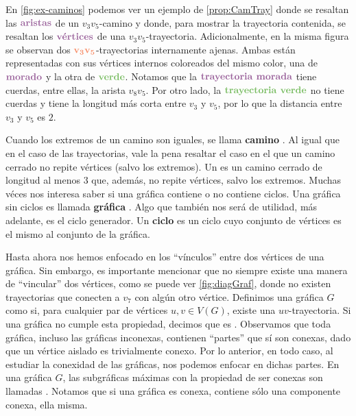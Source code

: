 En \cref{fig:ex-caminos} podemos ver un ejemplo de \cref{prop:CamTray} donde se
resaltan las ${\color{morado}\bf aristas}$ de un $v_3 v_5$-camino y donde, para
mostrar la trayectoria contenida, se resaltan los
${\color{morado}\textbf{v\'ertices}}$ de una $v_3 v_5$-trayectoria.
Adicionalmente, en la misma figura se observan dos ${\color{coral}\bf v_3
v_5}$-trayectorias internamente ajenas. Ambas est\'an representadas con sus
v\'ertices internos coloreados del mismo color, una de ${\color{morado}\bf
morado}$ y la otra de ${\color{verde}\bf verde}$. Notamos que la
${\color{morado}\textbf{trayectoria morada}}$ tiene cuerdas, entre ellas, la
arista $v_8v_5$. Por otro lado, la ${\color{verde}\textbf{trayectoria verde}}$
no tiene cuerdas y tiene la longitud m\'as corta entre $v_3$ y $v_5$, por lo que
la distancia entre $v_3$ y $v_5$ es $2$.

Cuando los extremos de un camino son iguales, se llama \textbf{camino}
. Al igual que en el caso de las trayectorias, vale
la pena resaltar el caso en el que un camino cerrado no repite v\'ertices (salvo
los extremos). Un  es un camino cerrado de longitud al menos $3$
que, adem\'as, no repite v\'ertices, salvo los extremos.  Muchas v\'eces nos
interesa saber si una gr\'afica contiene o no contiene ciclos. Una gr\'afica sin
ciclos es llamada \textbf{gr\'afica} . Algo que
tambi\'en nos ser\'a de utilidad, m\'as adelante, es el ciclo generador. Un
\textbf{ciclo} es un ciclo cuyo conjunto de
v\'ertices es el mismo al conjunto de la gr\'afica.
   
Hasta ahora nos hemos enfocado en los ``v\'inculos'' entre dos v\'ertices de una
gr\'afica. Sin embargo, es importante mencionar que no siempre existe una manera de
``vincular'' dos v\'ertices, como se puede ver \cref{fig:diagGraf}, donde no
existen trayectorias que conecten a $v_7$ con alg\'un otro v\'ertice.  Definimos
una gr\'afica $G$ como  si,
para cualquier par de v\'ertices $u,v \in V(G)$, existe una $uv$-trayectoria. Si
una gr\'afica no cumple esta propiedad, decimos que es
. Observamos que toda gr\'afica, incluso las
gr\'aficas inconexas, contienen ``partes'' que s\'i son conexas, dado que un
v\'ertice aislado es trivialmente conexo. Por lo anterior, en todo caso, al
estudiar la conexidad de las gr\'aficas, nos podemos enfocar en dichas partes.
En una gr\'afica $G$, las subgr\'aficas m\'aximas con la propiedad de ser
conexas son llamadas .
Notamos que si una gr\'afica es conexa, contiene s\'olo una componente conexa,
ella misma. 

